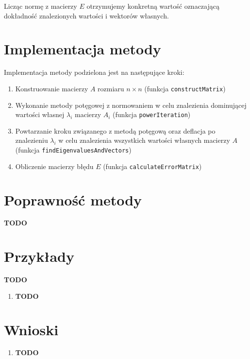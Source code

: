 \documentclass[12pt]{article}
\begin{document}
	Licząc normę z macierzy $E$ otrzymujemy konkretną wartość oznaczającą dokładność znalezionych wartości i wektorów własnych.
	
	\section{Implementacja metody}
	Implementacja metody podzielona jest na następujące kroki:
	\begin{enumerate}
		\item Konstruowanie macierzy $A$ rozmiaru $n \times n$ (funkcja \texttt{constructMatrix})
		\item Wykonanie metody potęgowej z normowaniem w celu znalezienia dominującej wartości własnej $\lambda_i$ macierzy $A_i$ (funkcja \texttt{powerIteration})
		\item Powtarzanie kroku związanego z metodą potęgową oraz deflacja po znalezieniu $\lambda_i$ w celu znalezienia wszystkich wartości własnych macierzy $A$ (funkcja \texttt{findEigenvaluesAndVectors})
		\item Obliczenie macierzy błędu $E$ (funkcja \texttt{calculateErrorMatrix})
	\end{enumerate}

	
	
	\section{Poprawność metody}
	\textbf{TODO}
	
	
	
	
	\section{Przykłady}
	\textbf{TODO}
	
	
	\begin{enumerate}[label=\textbf{Przykład \arabic*}]
		\item
		\textbf{TODO}
		
	\end{enumerate}
	
	
	
	
	\section{Wnioski}
	\begin{enumerate}
		\item \textbf{TODO}
	\end{enumerate}
	
	
	
\end{document}
